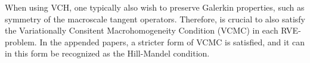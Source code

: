 \documentclass[MikaelDissertation.tex]{subfiles}
\begin{document}
When using VCH, one typically also wish to preserve Galerkin properties, such as symmetry of the macroscale tangent operators. Therefore, is crucial to also satisfy the Variationally Consitent Macrohomogeneity Condition (VCMC) in each RVE-problem.
In the appended papers, a stricter form of VCMC is satisfied, and it can in this form be recognized as the Hill-Mandel condition.


% 
% 
% 
\end{document}
